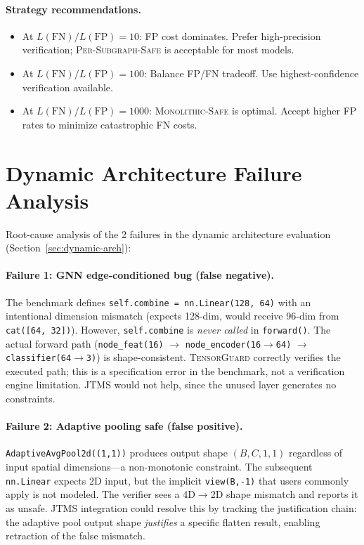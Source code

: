\documentclass[11pt]{article}
\begin{document}
\paragraph{Strategy recommendations.}
\begin{itemize}[leftmargin=2em,nosep]
  \item At $L(\mathrm{FN})/L(\mathrm{FP}) = 10$: FP cost dominates.
    Prefer high-precision verification; \textsc{Per-Subgraph-Safe}
    is acceptable for most models.
  \item At $L(\mathrm{FN})/L(\mathrm{FP}) = 100$: Balance FP/FN
    tradeoff. Use highest-confidence verification available.
  \item At $L(\mathrm{FN})/L(\mathrm{FP}) = 1000$:
    \textsc{Monolithic-Safe} is optimal. Accept higher FP rates
    to minimize catastrophic FN costs.
\end{itemize}


\section{Dynamic Architecture Failure Analysis}\label{app:dynamic-failure}

Root-cause analysis of the 2 failures in the dynamic architecture
evaluation (Section~\ref{sec:dynamic-arch}):

\paragraph{Failure 1: GNN edge-conditioned bug (false negative).}
The benchmark defines \texttt{self.combine = nn.Linear(128, 64)} with
an intentional dimension mismatch (expects 128-dim, would receive
96-dim from \texttt{cat([64, 32])}). However, \texttt{self.combine}
is \emph{never called} in \texttt{forward()}.  The actual forward
path (\texttt{node\_feat(16)} $\to$ \texttt{node\_encoder(16$\to$64)}
$\to$ \texttt{classifier(64$\to$3)}) is shape-consistent.
\textsc{TensorGuard} correctly verifies the executed path; this is a
specification error in the benchmark, not a verification engine
limitation.  JTMS would not help, since the unused layer generates
no constraints.

\paragraph{Failure 2: Adaptive pooling safe (false positive).}
\texttt{AdaptiveAvgPool2d((1,1))} produces output shape $(B,C,1,1)$
regardless of input spatial dimensions---a non-monotonic constraint.
The subsequent \texttt{nn.Linear} expects 2D input, but the implicit
\texttt{view(B,-1)} that users commonly apply is not modeled.  The
verifier sees a 4D$\to$2D shape mismatch and reports it as unsafe.
JTMS integration could resolve this by tracking the justification
chain: the adaptive pool output shape \emph{justifies} a specific
flatten result, enabling retraction of the false mismatch.
\end{document}
